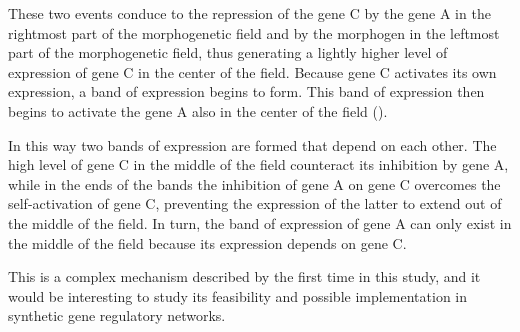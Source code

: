 \documentclass[10pt,letterpaper]{article}
\newcommand{\lorem}{{\bf LOREM}}
\newcommand{\ipsum}{{\bf IPSUM}}
\begin{document}
These two events conduce to the repression of the gene C by the gene A in the
rightmost part of the morphogenetic field and by the morphogen in the leftmost
part of the morphogenetic field, thus generating a lightly higher level of
expression of gene C in the center of the field. Because gene C activates its
own expression, a band of expression begins to form. This band of expression
then begins to activate the gene A also in the center of the field
().


In this way two bands of expression are formed that depend on each other. The
high level of gene C in the middle of the field counteract its inhibition by
gene A, while in the ends of the bands the inhibition of gene A on gene C
overcomes the self-activation of gene C, preventing the expression of the
latter to extend out of the middle of the field. In turn, the band of
expression of gene A can only exist in the middle of the field because its
expression depends on gene C.

This is a complex mechanism described by the first time in this study, and it
would be interesting to study its feasibility and possible implementation in
synthetic gene regulatory networks.

% 
% 
% 
% 
% 
\end{document}
